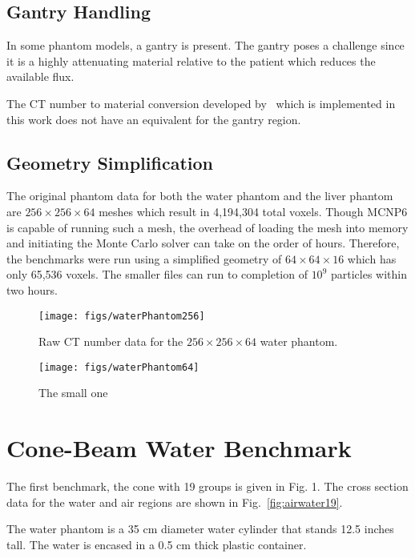\subsection{Gantry Handling}
In some phantom models, a gantry is present. The gantry poses a challenge since it is a highly attenuating material relative to the patient which reduces the available flux.

The CT number to material conversion developed by~\cite{ref:ottossonr} which is implemented in this work does not have an equivalent for the gantry region.

\subsection{Geometry Simplification}
The original phantom data for both the water phantom and the liver phantom are $256\times256\times64$ meshes which result in 4,194,304 total voxels. Though MCNP6 is capable of running such a mesh, the overhead of loading the mesh into memory and initiating the Monte Carlo solver can take on the order of hours. Therefore, the benchmarks were run using a simplified geometry of $64\times64\times16$ which has only 65,536 voxels. The smaller files can run to completion of $10^9$ particles within two hours.

\begin{figure}[tb]
  \begin{center}
   \texttt{[image: figs/waterPhantom256]}
  \end{center}
  \caption{Raw CT number data for the $256 \times 256 \times 64$ water phantom.}
\label{fig:waterPhantom256}
\end{figure}

\begin{figure}[tb]
  \begin{center}
   \texttt{[image: figs/waterPhantom64]}
  \end{center}
  \caption{The small one}
\label{fig:waterPhantom64}
\end{figure}

\section{Cone-Beam Water Benchmark}

The first benchmark, the cone with 19 groups is given in Fig. 1. The cross section data for the water and air regions are shown in Fig.~\ref{fig:airwater19}.

The water phantom is a 35 cm diameter water cylinder that stands 12.5 inches tall. The water is encased in a 0.5 cm thick plastic container.

